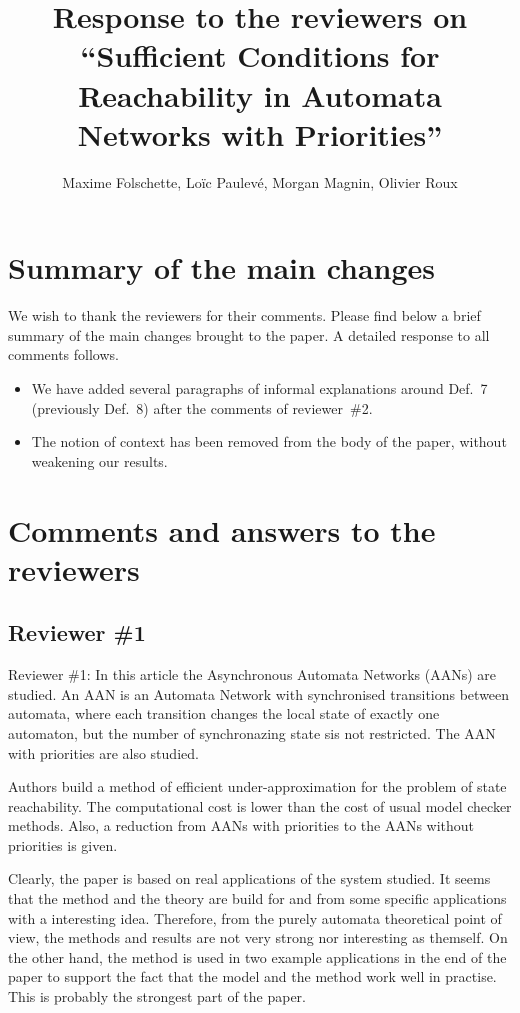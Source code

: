 \documentclass[11pt]{article}
\title{Response to the reviewers on “Sufficient Conditions for Reachability in Automata Networks with Priorities”}
\author{Maxime Folschette, Loïc Paulevé, Morgan Magnin, Olivier Roux}
\date{}
\begin{document}
\maketitle



\section*{Summary of the main changes}

We wish to thank the reviewers for their comments.
Please find below a brief summary of the main changes brought to the paper.
A detailed response to all comments follows.

\begin{itemize}
  \item We have added several paragraphs of informal explanations around Def.~7 (previously Def.~8) after the comments of reviewer~\#2.
  \item The notion of context has been removed from the body of the paper,
    without weakening our results.
\end{itemize}



\section*{Comments and answers to the reviewers}

\subsection*{Reviewer \#1}

Reviewer \#1: In this article the  Asynchronous Automata Networks (AANs) are studied. An AAN is an Automata Network with synchronised transitions between automata, where each transition changes the local state of exactly one automaton, but the number of synchronazing state sis not restricted.  The AAN with priorities are also studied. 

Authors build a method of efficient under-approximation for the problem of state reachability. The computational cost is lower than the cost of usual model checker methods. Also, a reduction from AANs with priorities to the AANs without priorities is given.

Clearly, the paper is based on real applications of the system studied. It seems that the method and the theory are build for and from some specific applications with a interesting idea. Therefore, from the purely automata theoretical point of view,  the methods and results are not very strong nor interesting as themself. On the other hand, the method is used in two example applications in the end of the paper to support the fact that the model and the method work well in practise. This is probably the strongest part of the paper.  
\end{document}

